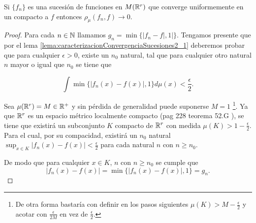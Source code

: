 \begin{lema} \label{lema:2_2_convergencia_uniforme_en_compactos}  
    Si $\{f_n\}$ es una sucesión de funciones en $M(\mathbb{R}^r)$ que converge
    uniformemente en un compacto a $f$ entonces $\rho_{\mu}(f_n, f) \longrightarrow 0$. 
\end{lema}  
\begin{proof} Para cada $n\in \mathbb{N}$ llamamos $g_n = \min\{|f_n - f|, 1|\}$.
    Tengamos presente que por el  lema \ref{lema:caracterizacionConvergenciaSucesiones2_1} 
    deberemos probar que para cualquier $\epsilon > 0$, 
    existe un $n_0$ natural, tal que para cualquier otro natural $n$ mayor o igual que $n_0$ se tiene que 

    \begin{equation}
        \int \min \{ |f_n(x) - f(x)|, 1\} d\mu(x) 
        < 
        \frac{\epsilon}{2}.
    \end{equation}  

    Sea $\mu(\mathbb{R}^r) = M \in \mathbb{R}^+$  y 
    sin pérdida de generalidad puede suponerse $M = 1$
     \footnote{De otra forma bastaría con definir 
    en los pasos siguientes $\mu(K) > M - \frac{\epsilon}{2}$ y acotar con $\frac{\epsilon}{2M}$ 
    en vez de $\frac{\epsilon}{2}$.}. 
    Ya que $\mathbb{R}^r$ es un espacio métrico localmente compacto
    (pag 228 teorema 52.G \cite{nla.cat-vn1819421}),
    se tiene que existirá un subconjunto $K$ compacto de $\mathbb{R}^r$ con medida $\mu(K) > 1 - \frac{\epsilon}{2}.$
    Para el cual, por su compacidad, existirá un  $n_0$ natural 
    $\sup_{x \in K} |f_n(x) - f(x)| < \frac{\epsilon}{2}$   
    para cada natural $n$ con $n\geq n_0.$ 
    
    De modo que para cualquier $x \in K$, 
     $n$ con $n\geq n_0$   se cumple que 
     \begin{equation}
        |f_n(x) - f(x)| 
        = 
        \min \{ |f_n(x) - f(x)|, 1\} 
        = 
        g_n.
     \end{equation}


\end{proof}
